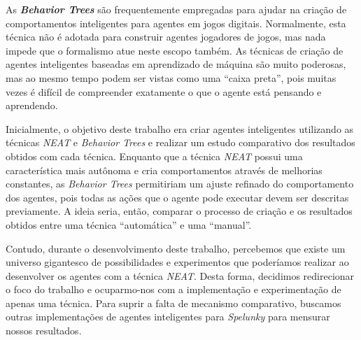 As \textbf{\textit{Behavior Trees}} são frequentemente empregadas para ajudar na
criação de comportamentos inteligentes para agentes em jogos digitais.
Normalmente, esta técnica não é adotada para construir agentes jogadores de
jogos, mas nada impede que o formalismo atue neste escopo também. As técnicas de
criação de agentes inteligentes baseadas em aprendizado de máquina são muito
poderosas, mas ao mesmo tempo podem ser vistas como uma ``caixa preta'', pois
muitas vezes é difícil de compreender exatamente o que o agente está pensando e
aprendendo.

Inicialmente, o objetivo deste trabalho era criar agentes inteligentes
utilizando as técnicas \textit{NEAT} e \textit{Behavior Trees} e realizar um
estudo comparativo dos resultados obtidos com cada técnica. Enquanto que a
técnica \textit{NEAT} possui uma característica mais autônoma e cria
comportamentos através de melhorias constantes, as \textit{Behavior Trees}
permitiriam um ajuste refinado do comportamento dos agentes, pois todas as ações
que o agente pode executar devem ser descritas previamente. A ideia seria,
então, comparar o processo de criação e os resultados obtidos entre uma técnica
``automática'' e uma ``manual''.

Contudo, durante o desenvolvimento deste trabalho, percebemos que existe um
universo gigantesco de possibilidades e experimentos que poderíamos realizar ao
desenvolver os agentes com a técnica \textit{NEAT}. Desta forma, decidimos
redirecionar o foco do trabalho e ocuparmo-nos com a implementação e
experimentação de apenas uma técnica. Para suprir a falta de mecanismo
comparativo, buscamos outras implementações de agentes inteligentes para
\textit{Spelunky} para mensurar nossos resultados.
